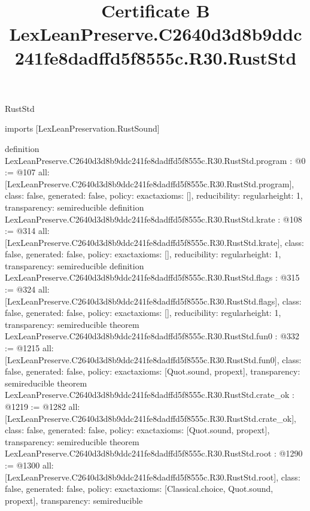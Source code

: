 \begin{lexlean}{RustStd}
\title{Certificate B LexLeanPreserve.C2640d3d8b9ddc241fe8dadffd5f8555c.R30.RustStd}
\begin{coremodule}
imports [LexLeanPreservation.RustSound]

definition LexLeanPreserve.C2640d3d8b9ddc241fe8dadffd5f8555c.R30.RustStd.program : @0 := @107 {
  all: [LexLeanPreserve.C2640d3d8b9ddc241fe8dadffd5f8555c.R30.RustStd.program],
  class: false,
  generated: false,
  policy: exact{axioms: []},
  reducibility: regular{height: 1},
  transparency: semireducible
}
definition LexLeanPreserve.C2640d3d8b9ddc241fe8dadffd5f8555c.R30.RustStd.krate : @108 := @314 {
  all: [LexLeanPreserve.C2640d3d8b9ddc241fe8dadffd5f8555c.R30.RustStd.krate],
  class: false,
  generated: false,
  policy: exact{axioms: []},
  reducibility: regular{height: 1},
  transparency: semireducible
}
definition LexLeanPreserve.C2640d3d8b9ddc241fe8dadffd5f8555c.R30.RustStd.flags : @315 := @324 {
  all: [LexLeanPreserve.C2640d3d8b9ddc241fe8dadffd5f8555c.R30.RustStd.flags],
  class: false,
  generated: false,
  policy: exact{axioms: []},
  reducibility: regular{height: 1},
  transparency: semireducible
}
theorem LexLeanPreserve.C2640d3d8b9ddc241fe8dadffd5f8555c.R30.RustStd.fun0 : @332 := @1215 {
  all: [LexLeanPreserve.C2640d3d8b9ddc241fe8dadffd5f8555c.R30.RustStd.fun0],
  class: false,
  generated: false,
  policy: exact{axioms: [Quot.sound, propext]},
  transparency: semireducible
}
theorem LexLeanPreserve.C2640d3d8b9ddc241fe8dadffd5f8555c.R30.RustStd.crate_ok : @1219 := @1282 {
  all: [LexLeanPreserve.C2640d3d8b9ddc241fe8dadffd5f8555c.R30.RustStd.crate_ok],
  class: false,
  generated: false,
  policy: exact{axioms: [Quot.sound, propext]},
  transparency: semireducible
}
theorem LexLeanPreserve.C2640d3d8b9ddc241fe8dadffd5f8555c.R30.RustStd.root : @1290 := @1300 {
  all: [LexLeanPreserve.C2640d3d8b9ddc241fe8dadffd5f8555c.R30.RustStd.root],
  class: false,
  generated: false,
  policy: exact{axioms: [Classical.choice, Quot.sound, propext]},
  transparency: semireducible
}


\end{coremodule}
\end{lexlean}
